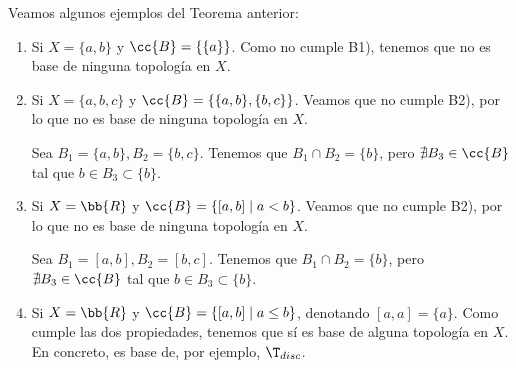 \begin{ejemplo} Veamos algunos ejemplos del Teorema anterior:
    \begin{enumerate}
        \item Si $X=\{a,b\}$ y $\cc{B}=\{\{a\}\}$. Como no cumple B1), tenemos que no es base de ninguna topología en $X$.

        \item Si $X=\{a,b,c\}$ y $\cc{B}=\{\{a,b\}, \{b,c\}\}$. Veamos que no cumple B2), por lo que no es base de ninguna topología en $X$.

        Sea $B_1=\{a,b\}, B_2=\{b,c\}$. Tenemos que $B_1\cap B_2=\{b\}$, pero $\nexists B_3\in \cc{B}$ tal que $b\in B_3\subset \{b\}$.

        \item Si $X=\bb{R}$ y $\cc{B}=\{[a,b]\mid a<b\}$. Veamos que no cumple B2), por lo que no es base de ninguna topología en $X$.

        Sea $B_1=[a,b], B_2=[b,c]$. Tenemos que $B_1\cap B_2=\{b\}$, pero $\nexists B_3\in \cc{B}$ tal que $b\in B_3\subset \{b\}$.

        \item Si $X=\bb{R}$ y $\cc{B}=\{[a,b]\mid a\leq b\}$, denotando $[a,a]=\{a\}$. Como cumple las dos propiedades, tenemos que sí es base de alguna topología en $X$. En concreto, es base de, por ejemplo, $\T_{disc}$.
    \end{enumerate}
\end{ejemplo}


